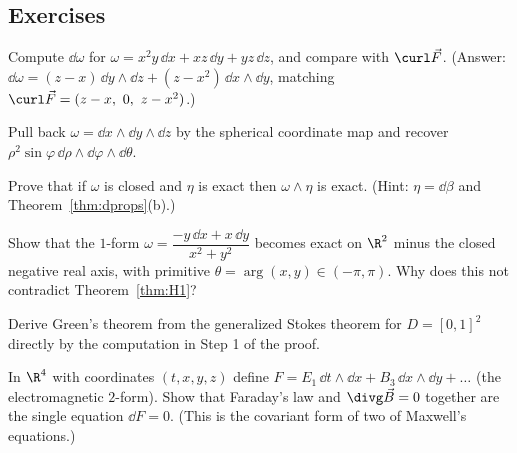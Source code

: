 \subsection*{Exercises}
\begin{exercise}
Compute $\dd\omega$ for $\omega=x^2y\,\dd x+xz\,\dd y+yz\,\dd z$, and compare with $\curl\vec F$. (Answer: $\dd\omega=(z-x)\,\dd y\wedge\dd z+(z-x^2)\,\dd x\wedge\dd y$, matching $\curl\vec F=(z-x,\ 0,\ z-x^2)$.)
\end{exercise}
\begin{exercise}
Pull back $\omega=\dd x\wedge\dd y\wedge\dd z$ by the spherical coordinate map and recover $\rho^2\sin\varphi\,\dd\rho\wedge\dd\varphi\wedge\dd\theta$.
\end{exercise}
\begin{exercise}
Prove that if $\omega$ is closed and $\eta$ is exact then $\omega\wedge\eta$ is exact. (Hint: $\eta=\dd\beta$ and Theorem~\ref{thm:dprops}(b).)
\end{exercise}
\begin{exercise}
Show that the $1$-form $\omega=\dfrac{-y\,\dd x+x\,\dd y}{x^2+y^2}$ becomes exact on $\R^2$ minus the closed negative real axis, with primitive $\theta=\arg(x,y)\in(-\pi,\pi)$. Why does this not contradict Theorem~\ref{thm:H1}?
\end{exercise}
\begin{exercise}
Derive Green's theorem from the generalized Stokes theorem for $D=[0,1]^2$ directly by the computation in Step 1 of the proof.
\end{exercise}
\begin{exercise}
In $\R^4$ with coordinates $(t,x,y,z)$ define $F=E_1\,\dd t\wedge\dd x+B_3\,\dd x\wedge\dd y+\dots$ (the electromagnetic $2$-form). Show that Faraday's law and $\divg\vec B=0$ together are the single equation $\dd F=0$. (This is the covariant form of two of Maxwell's equations.)
\end{exercise}
